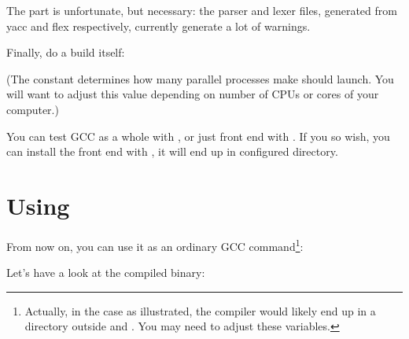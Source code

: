 \documentclass[a4paper,11pt]{article}
\begin{document}
The  part is unfortunate, but necessary:
the parser and lexer  files, generated from yacc and flex
respectively, currently generate a lot of warnings.

Finally, do a build itself:


(The  constant determines how many parallel processes make
should launch.  You will want to adjust this value depending on number
of CPUs or cores of your computer.)

You can test GCC as a whole with , or just  front end with .  If you so
wish, you can install the front end with , it
will end up in configured  directory.

\section{Using }

From now on, you can use it as an ordinary GCC
command\footnote{Actually, in the case as illustrated, the compiler
would likely end up in a directory outside  and
.  You may need to adjust these
variables.}:


Let's have a look at the compiled binary:

\end{document}
